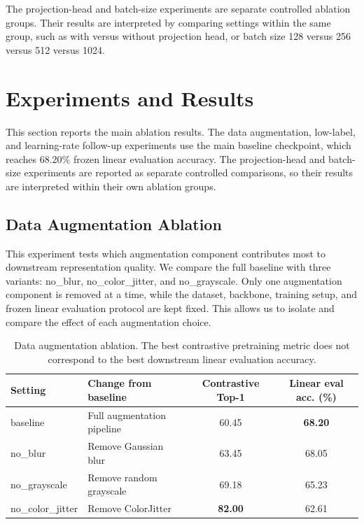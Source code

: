 \documentclass[10pt]{article}
\begin{document}
The projection-head and batch-size experiments are separate controlled ablation groups. Their results are interpreted by comparing settings within the same group, such as with versus without projection head, or batch size 128 versus 256 versus 512 versus 1024.

\section{Experiments and Results}

This section reports the main ablation results. The data augmentation, low-label, and learning-rate follow-up experiments use the main baseline checkpoint, which reaches 68.20\% frozen linear evaluation accuracy. The projection-head and batch-size experiments are reported as separate controlled comparisons, so their results are interpreted within their own ablation groups.

\subsection{Data Augmentation Ablation}

This experiment tests which augmentation component contributes most to downstream representation quality. We compare the full baseline with three variants: no\_blur, no\_color\_jitter, and no\_grayscale. Only one augmentation component is removed at a time, while the dataset, backbone, training setup, and frozen linear evaluation protocol are kept fixed. This allows us to isolate and compare the effect of each augmentation choice.

\begin{table}[H]
\centering
\small
\begin{tabular}{llcc}
\toprule
\textbf{Setting} & \textbf{Change from baseline} & \textbf{Contrastive Top-1} & \textbf{Linear eval acc. (\%)} \\
\midrule
baseline & Full augmentation pipeline & 60.45 & \textbf{68.20} \\
no\_blur & Remove Gaussian blur & 63.45 & 68.05 \\
no\_grayscale & Remove random grayscale & 69.18 & 65.23 \\
no\_color\_jitter & Remove ColorJitter & \textbf{82.00} & 62.61 \\
\bottomrule
\end{tabular}
\caption{Data augmentation ablation. The best contrastive pretraining metric does not correspond to the best downstream linear evaluation accuracy.}
\label{tab:augmentation}
\end{table}
\end{document}
